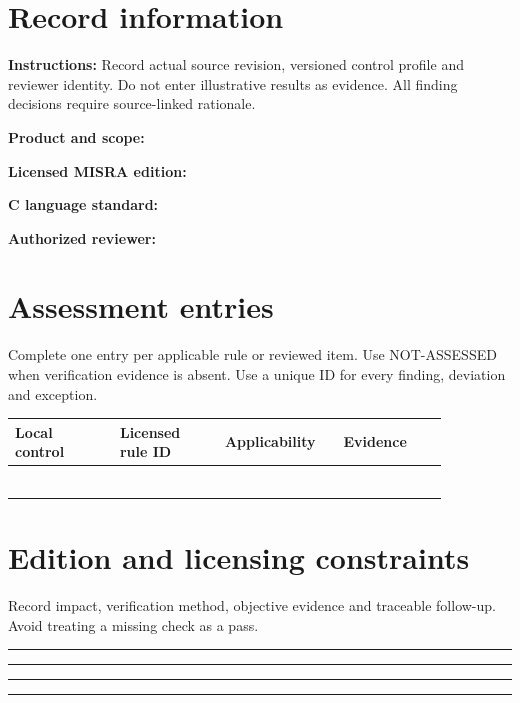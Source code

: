 \documentclass[10pt,letterpaper]{article}
\begin{document}
\makedoctitle
\makedocsummary
\section{Record information}
\textbf{Instructions:} Record actual source revision, versioned control profile and reviewer identity. Do not enter illustrative results as evidence. All finding decisions require source-linked rationale.\par\medskip
\noindent\textbf{Product and scope:}\quad\hrulefill\par\vspace{11pt}
\noindent\textbf{Licensed MISRA edition:}\quad\hrulefill\par\vspace{11pt}
\noindent\textbf{C language standard:}\quad\hrulefill\par\vspace{11pt}
\noindent\textbf{Authorized reviewer:}\quad\hrulefill\par\vspace{11pt}
\section{Assessment entries}
Complete one entry per applicable rule or reviewed item. Use NOT-ASSESSED when verification evidence is absent. Use a unique ID for every finding, deviation and exception.\par\medskip
\begin{longtable}{|p{0.215\linewidth}|p{0.215\linewidth}|p{0.215\linewidth}|p{0.215\linewidth}|}
\hline
\textbf{Local control} & \textbf{Licensed rule ID} & \textbf{Applicability} & \textbf{Evidence}\\\hline
\endhead
\rule{0pt}{27pt} & & & \\\hline
\rule{0pt}{27pt} & & & \\\hline
\rule{0pt}{27pt} & & & \\\hline
\rule{0pt}{27pt} & & & \\\hline
\rule{0pt}{27pt} & & & \\\hline
\rule{0pt}{27pt} & & & \\\hline
\end{longtable}
\section{Edition and licensing constraints}
Record impact, verification method, objective evidence and traceable follow-up. Avoid treating a missing check as a pass.\par\medskip
\noindent\rule{\linewidth}{0.4pt}\par\vspace{16pt}
\noindent\rule{\linewidth}{0.4pt}\par\vspace{16pt}
\noindent\rule{\linewidth}{0.4pt}\par\vspace{16pt}
\noindent\rule{\linewidth}{0.4pt}\par\vspace{16pt}
\end{document}
